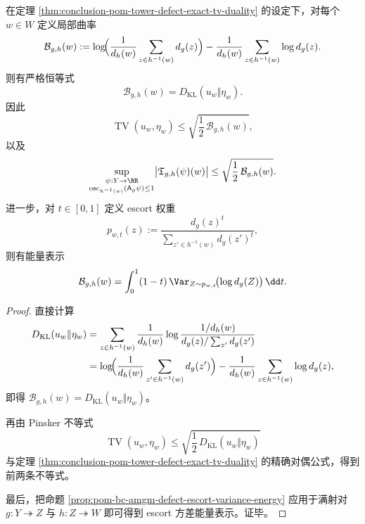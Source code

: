 \begin{theorem}\label{thm:conclusion-pom-local-curvature-is-kl-sizebias}
在定理 \ref{thm:conclusion-pom-tower-defect-exact-tv-duality} 的设定下，对每个 \(w\in W\) 定义局部曲率
\[
\mathcal B_{g,h}(w)
:=
\log\!\Bigl(\frac1{d_h(w)}\sum_{z\in h^{-1}(w)}d_g(z)\Bigr)
-\frac1{d_h(w)}\sum_{z\in h^{-1}(w)}\log d_g(z).
\]
则有严格恒等式
\[
\mathcal B_{g,h}(w)=D_{\mathrm{KL}}(u_w\Vert \eta_w).
\]
因此
\[
\operatorname{TV}(u_w,\eta_w)\le \sqrt{\frac12\,\mathcal B_{g,h}(w)},
\]
以及
\[
\sup_{\substack{\psi:Y\to\RR\\
\operatorname{osc}_{h^{-1}(w)}(\mathsf A_g\psi)\le 1}}
\bigl|\mathfrak T_{g,h}(\psi)(w)\bigr|
\le
\sqrt{\frac12\,\mathcal B_{g,h}(w)}.
\]
进一步，对 \(t\in[0,1]\) 定义 escort 权重
\[
p_{w,t}(z):=
\frac{d_g(z)^t}{\sum_{z'\in h^{-1}(w)}d_g(z')^t},
\]
则有能量表示
\[
\mathcal B_{g,h}(w)
=
\int_0^1(1-t)\,
\Var_{Z\sim p_{w,t}}\!\bigl(\log d_g(Z)\bigr)\,\dd t.
\]
\end{theorem}
\begin{proof}
直接计算
\[
\begin{aligned}
D_{\mathrm{KL}}(u_w\Vert \eta_w)
&=
\sum_{z\in h^{-1}(w)}
\frac{1}{d_h(w)}
\log\frac{1/d_h(w)}{d_g(z)/\sum_{z'}d_g(z')}\\
&=
\log\!\Bigl(\frac1{d_h(w)}\sum_{z'\in h^{-1}(w)}d_g(z')\Bigr)
-\frac1{d_h(w)}\sum_{z\in h^{-1}(w)}\log d_g(z),
\end{aligned}
\]
即得 \(\mathcal B_{g,h}(w)=D_{\mathrm{KL}}(u_w\Vert \eta_w)\)。

再由 Pinsker 不等式
\[
\operatorname{TV}(u_w,\eta_w)\le \sqrt{\frac12\,D_{\mathrm{KL}}(u_w\Vert \eta_w)}
\]
与定理 \ref{thm:conclusion-pom-tower-defect-exact-tv-duality} 的精确对偶公式，得到前两条不等式。

最后，把命题 \ref{prop:pom-bc-amgm-defect-escort-variance-energy} 应用于满射对
\(
g:Y\twoheadrightarrow Z
\)
与
\(
h:Z\twoheadrightarrow W
\)
即可得到 escort 方差能量表示。证毕。
\end{proof}

